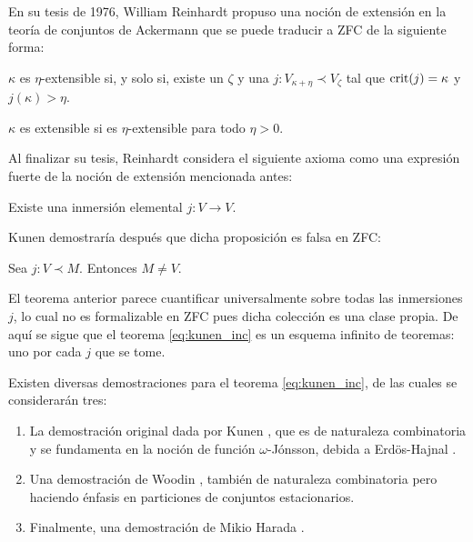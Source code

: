 \documentclass[12pt]{article}
\begin{document}
    En su tesis de 1976, William Reinhardt \cite{reinhardt_ackermanns_1970} propuso una noción de extensión en
    la teoría de conjuntos de Ackermann \cite{ackermann_zur_1956} que se puede traducir a ZFC de la siguiente forma:
    \begin{defi}
        $\kappa$ es $\eta$-extensible si, y solo si, existe un $\zeta$ y una $j\colon V_{\kappa+\eta}\prec V_\zeta$
        tal que $\mathrm { crit } ( j ) = \kappa$ y $j(\kappa) > \eta$.
    \end{defi}
    \begin{defi}
        $\kappa$ es extensible si es $\eta$-extensible para todo $\eta>0$.
    \end{defi}


    Al finalizar su tesis, Reinhardt considera el siguiente axioma como una expresión fuerte
    de la noción de extensión mencionada antes:
    \begin{prop}
        Existe una inmersión elemental $j\colon V\to V$.
    \end{prop}

    Kunen \cite{kunen_elementary_1971} demostraría después que dicha proposición es falsa
    en ZFC:
    \begin{teo}
        Sea $j\colon V\prec M$. Entonces $M\neq V$.
    \end{teo}

    El teorema anterior parece cuantificar universalmente sobre todas las inmersiones $j$,
    lo cual no es formalizable en ZFC pues dicha colección es una clase propia. De aquí se sigue
    que el teorema \ref{eq:kunen_inc} es un esquema infinito de teoremas: uno por cada $j$ que se tome.

    Existen diversas demostraciones para el teorema \ref{eq:kunen_inc}, de las cuales se considerarán tres:
    \begin{enumerate}
        \item La demostración original dada por Kunen \cite{kunen_elementary_1971}, que
              es de naturaleza combinatoria y se fundamenta en la noción de función
              $\omega$-Jónsson, debida a Erdös-Hajnal \cite{erdos_problem_1966}.
        \item Una demostración de Woodin \cite[Pág 320]{kanamori_higher_2009}, también de naturaleza combinatoria
              pero haciendo énfasis en particiones de conjuntos estacionarios.
        \item Finalmente, una demostración de Mikio Harada \cite[Pág 321]{kanamori_higher_2009}.
    \end{enumerate}
\end{document}

